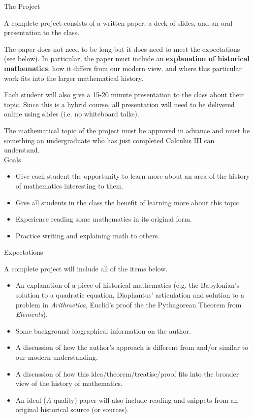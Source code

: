 \documentclass[12pt]{article}
\renewcommand{\emph}[1]{\textsf{\textbf{#1}}}
\begin{document}
{\large{The Project}}

A complete project consists of a written paper, a deck of slides, and an oral presentation to the class. 

The paper does not need to be long but it does need to meet the expectations (see below). In particular, the paper must include an \emph{explanation of historical mathematics}, how it differs from our modern view, and where this particular work fits into the larger mathematical history.

Each student will also give a 15-20 minute presentation to the class about their topic. Since this is a hybrid course, all presentation will need to be delivered online using slides (i.e. no whiteboard talks).

The mathematical topic of the project must be approved in advance and must be something an undergraduate who has just completed Calculus III can understand.\\

{\large{Goals}}

\begin{itemize}
\item Give each student the opportunity to learn more about an area of the history of mathematics interesting to them.
\item Give all students in the class the benefit of learning more about this topic.
\item Experience reading some mathematics in its original form.
\item Practice writing and explaining math to others. 
\end{itemize}

{\large{Expectations}}

A complete project will include all of the items below.
\begin{itemize}
\item An explanation of a piece of historical mathematics (e.g. the Babylonian's solution to a quadratic equation, Diophantus' articulation and solution to a problem in \textit{Arithmetica}, Euclid's proof the the Pythagorean Theorem from \textit{Elements}).
\item Some background biographical information on the author.
\item A discussion of how the author's approach is different from and/or similar to our modern understanding.
\item A discussion of how this idea/theorem/treatise/proof fits into the broader view of the history of mathematics.
\item An ideal ($A$-quality) paper will also include reading and snippets from an original historical source (or sources).
\end{itemize}
\end{document}
